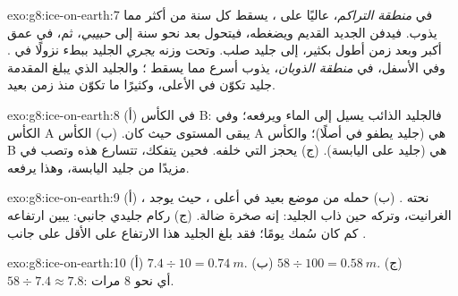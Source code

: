 \begin{solution}{exo:g8:ice-on-earth:7}
في \emph{منطقة التراكم}، عاليًا على ، يسقط كل سنة من  أكثر مما
يذوب. فيدفن  الجديد  القديم ويضغطه، فيتحول بعد نحو سنة إلى
\emph{ حبيبي}، ثم، في عمق أكبر وبعد زمن أطول بكثير، إلى جليد صلب. وتحت
وزنه \emph{يجري} الجليد ببطء نزولًا في . وفي الأسفل، في \emph{منطقة
الذوبان}، يذوب أسرع مما يسقط ؛ والجليد الذي يبلغ المقدمة جليد تكوّن في
الأعلى، وكثيرًا ما تكوّن منذ زمن بعيد.
\end{solution}

\begin{solution}{exo:g8:ice-on-earth:8}
(أ) في الكأس B: فالجليد الذائب يسيل إلى الماء ويرفعه؛ وفي الكأس A يبقى
المستوى حيث كان. (ب) الكأس A هي  (جليد يطفو في  أصلًا)؛
والكأس B هي  (جليد على اليابسة). (ج)  يحجز  التي خلفه. فحين يتفكك، تتسارع هذه  وتصب في 
مزيدًا من جليد اليابسة، وهذا يرفعه.
\end{solution}

\begin{solution}{exo:g8:ice-on-earth:9}
(أ) ، نحته . (ب) حمله  من موضع بعيد في
أعلى ، حيث يوجد الغرانيت، وتركه حين ذاب الجليد: إنه صخرة ضالة. (ج) ركام
جليدي جانبي: يبين ارتفاعه كم كان سُمك  يومًا؛ فقد بلغ الجليد هذا
الارتفاع على الأقل على جانب .
\end{solution}

\begin{solution}{exo:g8:ice-on-earth:10}
(أ) $7.4 \div 10 = \qty{0.74}{m}$. (ب) $58 \div 100 = \qty{0.58}{m}$.
(ج) $58 \div 7.4 \approx 7.8$: أي نحو 8 مرات.
\end{solution}

